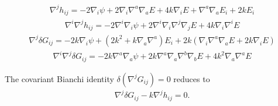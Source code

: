 \documentclass[10pt,letterpaper]{article}
\numberwithin{equation}{section}
\begin{document}
\begin{eqnarray}
\nabla^j h_{ij} = -2\nabla_i \psi + 2\nabla_i \nabla^a\nabla_a E +4k\nabla_i E + \nabla^a \nabla_a E_i + 2k E_i
\end{eqnarray}
\begin{eqnarray}
\nabla^i \nabla^j h_{ij} = -2\nabla^i \nabla_i \psi + 2\nabla^i\nabla_i \nabla^j\nabla_j E + 4k \nabla_i \nabla^i E
\label{hijdt}
\end{eqnarray}
\begin{eqnarray}
\nabla^j \delta G_{ij} =  -2k\nabla_i \psi + (2k^2+k\nabla_a\nabla^a )E_i + 2k( \nabla_i \nabla^a\nabla_a E + 2k \nabla_i E)
\end{eqnarray}
\begin{eqnarray}
\nabla^i \nabla^j \delta G_{ij} = -2k\nabla^a \nabla_a \psi + 2k \nabla^a\nabla_a\nabla^b \nabla_b E + 4k^2\nabla_a\nabla^a E
\end{eqnarray}

The covariant Bianchi identity $\delta (\nabla^j G_{ij}) =0 $ reduces to 
\begin{eqnarray}
\nabla^j \delta G_{ij} - k \nabla^j h_{ij} = 0.
\end{eqnarray}

\end{document}
